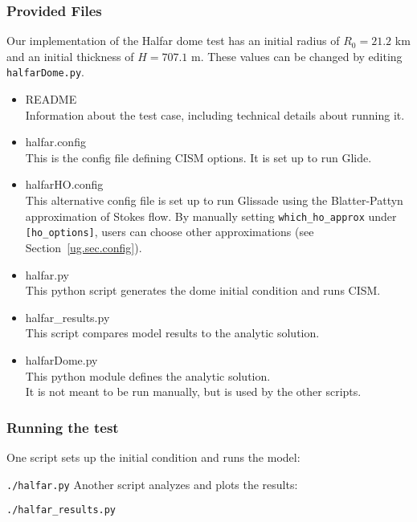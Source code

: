 \subsubsection{Provided Files}
\label{subsec:halfar_files}

Our implementation of the Halfar dome test has an initial radius of $R_0=21.2$ km and an initial thickness of $H=707.1$ m.
These values can be changed by editing \texttt{halfarDome.py}.

\begin{itemize}
	\item README \\
		Information about the test case, including technical details about running it.
	\item halfar.config \\
	        This is the config file defining CISM options. It is set up to run Glide. \\
        \item halfarHO.config \\
              This alternative config file is set up to run Glissade
              using the Blatter-Pattyn approximation of Stokes flow. By manually setting
              \texttt{which\_ho\_approx} under \texttt{[ho\_options]}, users can choose other approximations 
              (see Section~\ref{ug.sec.config}).
	\item halfar.py \\
		This python script generates the dome initial condition and runs CISM.
	\item halfar\_results.py \\
		This script compares model results to the analytic solution.
	\item halfarDome.py \\
		This python module defines the analytic solution. \\
    		 It is not meant to be run manually, but is used by the other scripts.
\end{itemize}

\subsubsection{Running the test}
One script sets up the initial condition and runs the model:

\texttt{./halfar.py}
%
Another script analyzes and plots the results:

\texttt{./halfar\_results.py}

